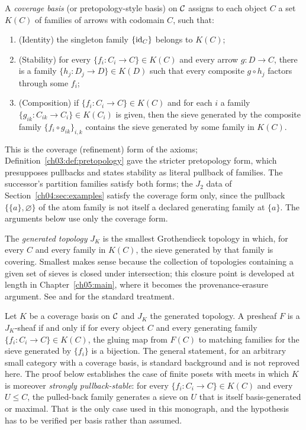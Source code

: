\begin{definition}\label{ch04:def:basis}
A \emph{coverage basis} (or pretopology-style basis) on $\mathcal{C}$ assigns to each
object $C$ a set $K(C)$ of families of arrows with codomain $C$, such that:
\begin{enumerate}
\item (Identity) the singleton family $\{\mathrm{id}_C\}$ belongs to $K(C)$;
\item (Stability) for every $\{f_i:C_i\to C\}\in K(C)$ and every arrow
$g:D\to C$, there is a family $\{h_j:D_j\to D\}\in K(D)$ such that every
composite $g\circ h_j$ factors through some $f_i$;
\item (Composition) if $\{f_i:C_i\to C\}\in K(C)$ and for each $i$ a family
$\{g_{ik}:C_{ik}\to C_i\}\in K(C_i)$ is given, then the sieve generated by
the composite family $\{f_i\circ g_{ik}\}_{i,k}$ contains the sieve generated
by some family in $K(C)$.
\end{enumerate}
This is the coverage (refinement) form of the axioms;
Definition~\ref{ch03:def:pretopology} gave the stricter pretopology form,
which presupposes pullbacks and states stability as literal pullback of
families. The successor's partition families satisfy both forms; the $J_2$
data of Section~\ref{ch04:sec:examples} satisfy the coverage form only, since
the pullback $\{\{a\},\varnothing\}$ of the atom family is not itself a
declared generating family at $\{a\}$. The arguments below use only the
coverage form.

The \emph{generated topology} $J_K$ is the smallest Grothendieck topology in
which, for every $C$ and every family in $K(C)$, the sieve generated by that
family is covering. Smallest makes sense because the collection of topologies
containing a given set of sieves is closed under intersection; this closure
point is developed at length in Chapter~\ref{ch05:main}, where it becomes the
provenance-erasure argument. See \cite{stacks00ZC} and
\cite[Chap.~III]{maclane} for the standard treatment.
\end{definition}

\begin{theorem}\label{ch04:thm:basis}
Let $K$ be a coverage basis on $\mathcal{C}$ and $J_K$ the generated topology. A
presheaf $F$ is a $J_K$-sheaf if and only if for every object $C$ and every
generating family $\{f_i:C_i\to C\}\in K(C)$, the gluing map from $F(C)$ to
matching families for the sieve generated by $\{f_i\}$ is a bijection. The
general statement, for an arbitrary small category with a coverage basis, is
standard background \cite{stacks00ZC,maclane} and is not reproved here. The
proof below establishes the case of finite posets with meets in which $K$ is
moreover \emph{strongly pullback-stable}: for every
$\{f_i:C_i\to C\}\in K(C)$ and every $U\le C$, the pulled-back family
generates a sieve on $U$ that is itself basis-generated or maximal. That is
the only case used in this monograph, and the hypothesis has to be verified
per basis rather than assumed.
\end{theorem}

